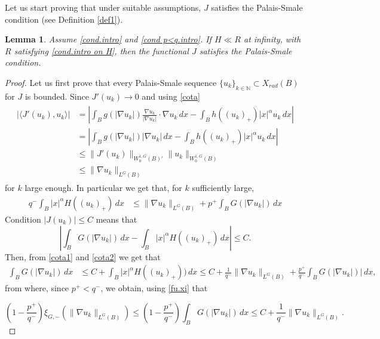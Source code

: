 \documentclass[leqno,twoside, 12pt]{amsart}
\theoremstyle{plain}
\numberwithin{equation}{section} \numberwithin{figure}{section}
\newtheorem{lemma}[theorem]{Lemma}
\theoremstyle{definition}
\numberwithin{equation}{section}
\newcommand{\N}{\mathbb{N}}
\begin{document}
Let us start proving that under suitable assumptions, $J$ satisfies the Palais-Smale condition (see Definition \ref{def1}).

\begin{lemma} \label{lema.1}
Assume \eqref{cond.intro} and \eqref{cond p<q.intro}.  If $H\ll R$ at infinity, with $R$ satisfying \eqref{cond.intro on H}, then the functional  $J$ satisfies the Palais-Smale condition.
\end{lemma}

\begin{proof}
Let us first prove that every Palais-Smale sequence $\{u_k\}_{k\in\N}\subset X_{rad}(B)$ for $J$ is bounded. Since $J'(u_k)\to 0$ and using \eqref{cota}
\begin{align}\label{cota1}
\begin{split}
|\langle J'(u_k),u_k\rangle| &=
\left| \int_B g(|\nabla u_k|)\frac{\nabla u_k}{|\nabla u_k|}\cdot \nabla u_k\,dx - \int_B h((u_k)_+) |x|^\alpha u_k\,dx \right|\\ 
&=
\left| \int_B g(|\nabla u_k|)|\nabla u_k|\,dx - \int_B h( (u_k)_+)|x|^\alpha u_k \,dx \right|\\
&\leq 
\|J'(u_k)\|_{W^{1,G}_0(B)'} \|u_k\|_{W^{1,G}_0(B)}\\
&\leq \|\nabla u_k\|_{L^G(B)}
\end{split}
\end{align}
for $k$ large enough. In particular we get that, for $k$ sufficiently large,
\begin{align*}
q^- \int_B |x|^{\alpha} H( (u_k)_+) \,dx &\leq \|\nabla u_k\|_{L^G(B)} + p^+ \int_B G(|\nabla u_k|)\,dx
\end{align*}
Condition $|J(u_k)|\leq C$ means that
\begin{equation} \label{cota2}
\left| \int_B G(|\nabla u_k|)\,dx - \int_B |x|^\alpha H((u_k)_{+}) \,dx\right| \leq C.
\end{equation}
Then, from  \eqref{cota1} and \eqref{cota2} we get that
\begin{align*}
\int_B G(|\nabla u_k|)\,dx  &\leq C +  \int_B |x|^\alpha H( (u_k)_{+}))\,dx\leq C+ \frac{1}{q^-} \|\nabla u_k\|_{L^G(B)}  +\frac{p^+}{q^-}  \int_B G(|\nabla u_k|)|\,dx,
\end{align*}
from where, since $p^+<q^-$, we obtain, using \eqref{fu.xi} that

$$
\left(1-\frac{p^+}{q^-}\right) \xi_{G,-}(\|\nabla u_k\|_{L^G(B)}) \leq \left(1-\frac{p^+}{q^-}\right) \int_B G(|\nabla u_k|)\,dx \leq C+ \frac{1}{q^-} \|\nabla u_k\|_{L^G(B)} . 
$$


\end{proof}
\end{document}
